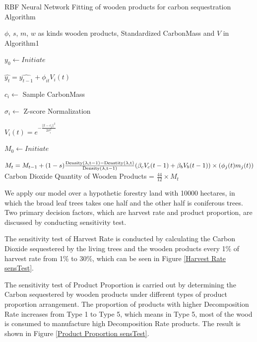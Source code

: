\documentclass{mcmthesis}
\numberwithin{figure}{section}
\numberwithin{table}{section}
\numberwithin{equation}{section}
\begin{document}
  \begin{algorithm}[htbp]
    \caption{RBF Neural Network Fitting of wooden products for carbon sequestration Algorithm} \label{Product Algo}
    \begin{algorithmic}[1]
        \Require
            $ \phi $, $ s $, $ m $, $ w $ as kinds wooden products, Standardized CarbonMass and $ V $ in Algorithm1 

                $ y_0 \gets Initiate $ 

                $ \hat{y_t} = \hat{y_{t-1}} + \phi_{it}V_i(t) $
            
                $ c_i\gets $ Sample CarbonMass
            
                $ \sigma_i\gets $ Z-score Normalization

                $ V_i(t) = e^{-\frac{||t-c_i||^2}{2\sigma_i^2}} $
            \EndFor

            $ M_0\gets Initiate $ 


            $ M_t = M_{t-1}+(1-s)\frac{\rm{Density}(\lambda, t-1)-\rm{Denstity}(\lambda,t)
            }{\rm{Density}(\lambda, t-1)}(\beta_cV_c(t-1)+\beta_bV_b(t-1))\times (\phi_j(t)m_j(t)) $ 
            \EndFor
        \EndFor
        \Ensure
        Carbon Dioxide Quantity of Wooden Products = $ \frac{44}{12} \times M_t$ 
    \end{algorithmic}
\end{algorithm}

We apply our model over a hypothetic forestry land with 10000 hectares, in which
the broad leaf trees takes one half and the other half is coniferous trees. Two
primary decision factors, which are harvest rate and product proportion,
are discussed by conducting sensitivity test. 
\par
The sensitivity test of Harvest Rate is conducted by calculating the Carbon Dioxide
sequestered by the living trees and the wooden products every 1\% of 
harvest rate from 1\% to 30\%, which can be seen in Figure \ref{Harvest Rate sensTest}.
\par
The sensitivity test of Product Proportion is carried out by determining the 
Carbon sequestered by wooden products under different types of product proportion
arrangement. The proportion of products with higher Decomposition Rate increases
from Type 1 to Type 5, which means in Type 5, most of the wood is consumed to manufacture
high Decomposition Rate products. The result is shown in Figure \ref{Product Proportion sensTest}.
\end{document}
